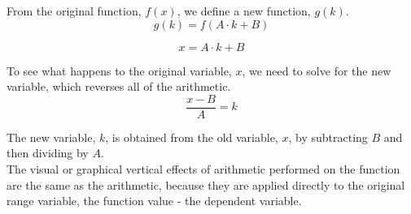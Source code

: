 \documentclass{ximera}
\begin{document}
From the original function, $f(x)$, we define a new function, $g(k)$.
\[
g(k) = f(A \cdot k + B)
\]


\[
x = A \cdot k + B
\]



To see what happens to the original variable, $x$, we need to solve for the new variable, which reverses all of the arithmetic. \\


\[
\frac{x - B}{A} = k
\]



The new variable, $k$, is obtained from the old variable, $x$, by subtracting $B$ and then dividing by $A$. \\


The visual or graphical vertical effects of arithmetic performed on the function are the same as the arithmetic, because they are applied directly to the original range variable, the function value - the dependent variable.
\end{document}
